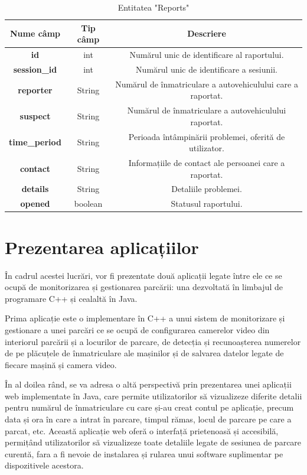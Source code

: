 \documentclass[12pt]{article}
\begin{document}
\begin{table}[h]
\centering
\begin{tabular}{|c|c|c|}
\hline
\textbf{Nume c\^{a}mp}  & \textbf{Tip c\^{a}mp} & \textbf{Descriere} \\
\hline
\textbf{id} & int & Num\u{a}rul unic de identificare al raportului.  \\
\hline
\textbf{session\_id} & int & Num\u{a}rul unic de identificare a sesiunii.  \\
\hline
\textbf{reporter} & String & Num\u{a}rul de \^{i}nmatriculare a autovehiculului care a raportat. \\
\hline
\textbf{suspect} & String & Num\u{a}rul de \^{i}nmatriculare a autovehiculului raportat.  \\
\hline
\textbf{time\_period} & String & Perioada \^{i}nt\^{a}mpin\u{a}rii problemei, oferit\u{a} de utilizator. \\
\hline
\textbf{contact} & String & Informațiile de contact ale persoanei care a raportat.  \\
\hline
\textbf{details} & String & Detaliile problemei. \\
\hline
\textbf{opened} & boolean & Statusul raportului.  \\
\hline
\end{tabular}
\caption{Entitatea "Reports"}
\end{table}

\newpage

\section{Prezentarea aplicațiilor}

\^{I}n cadrul acestei lucr\u{a}ri, vor fi prezentate dou\u{a} aplicații legate \^{i}ntre ele ce se ocup\u{a} de monitorizarea și gestionarea parc\u{a}rii: una dezvoltat\u{a} \^{i}n limbajul de programare C++ și cealalt\u{a} \^{i}n Java.

Prima aplicație este o implementare \^{i}n C++ a unui sistem de monitorizare și gestionare a unei parc\u{a}ri ce se ocup\u{a} de configurarea camerelor video din interiorul parc\u{a}rii și a locurilor de parcare, de detecția și recunoașterea numerelor de pe pl\u{a}cuțele de \^{i}nmatriculare ale mașinilor și de salvarea datelor legate de fiecare mașin\u{a} și camera video. 

\^{I}n al doilea r\^{a}nd, se va adresa o alt\u{a} perspectiv\u{a} prin prezentarea unei aplicații web implementate \^{i}n Java, care permite utilizatorilor s\u{a} vizualizeze diferite detalii pentru num\u{a}rul de \^{i}nmatriculare cu care și-au creat contul pe aplicație, precum data și ora \^{i}n care a intrat \^{i}n parcare, timpul r\u{a}mas, locul de parcare pe care a parcat, etc. Aceast\u{a} aplicație web ofer\u{a} o interfaț\u{a} prietenoas\u{a} și accesibil\u{a}, permiț\^{a}nd utilizatorilor s\u{a} vizualizeze toate detaliile legate de sesiunea de parcare curent\u{a}, fara a fi nevoie de instalarea și rularea unui software suplimentar pe dispozitivele acestora.
\end{document}
